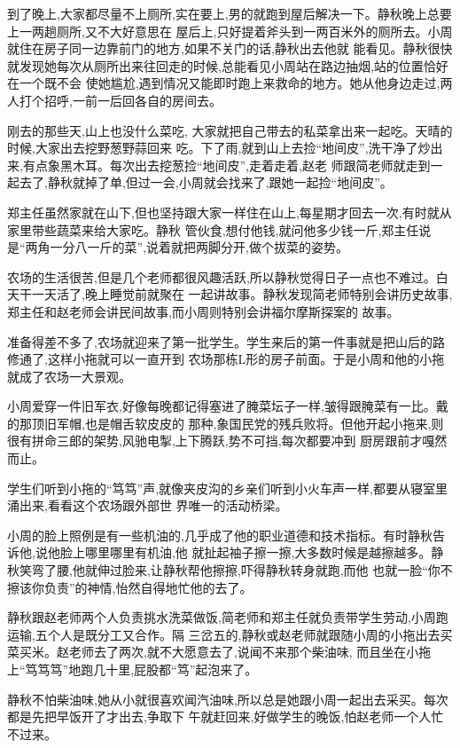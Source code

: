 ﻿\documentclass[12pt]{article}
\begin{document}
到了晚上,大家都尽量不上厕所,实在要上,男的就跑到屋后解决一下。静秋晚上总要上一两趟厕所,又不大好意思在
屋后上,只好提着斧头到一两百米外的厕所去。小周就住在房子同一边靠前门的地方,如果不关门的话,静秋出去他就
能看见。静秋很快就发现她每次从厕所出来往回走的时候,总能看见小周站在路边抽烟,站的位置恰好在一个既不会
使她尴尬,遇到情况又能即时跑上来救命的地方。她从他身边走过,两人打个招呼,一前一后回各自的房间去。



刚去的那些天,山上也没什么菜吃, 大家就把自己带去的私菜拿出来一起吃。天晴的时候,大家出去挖野葱野蒜回来
吃。下了雨,就到山上去捡``地间皮'',洗干净了炒出来,有点象黑木耳。每次出去挖葱捡``地间皮'',走着走着,赵老
师跟简老师就走到一起去了,静秋就掉了单,但过一会,小周就会找来了,跟她一起捡``地间皮''。

郑主任虽然家就在山下,但也坚持跟大家一样住在山上,每星期才回去一次,有时就从家里带些蔬菜来给大家吃。静秋
管伙食,想付他钱,就问他多少钱一斤,郑主任说是``两角一分八一斤的菜'',说着就把两脚分开,做个拔菜的姿势。

农场的生活很苦,但是几个老师都很风趣活跃,所以静秋觉得日子一点也不难过。白天干一天活了,晚上睡觉前就聚在
一起讲故事。静秋发现简老师特别会讲历史故事,郑主任和赵老师会讲民间故事,而小周则特别会讲福尔摩斯探案的
故事。

准备得差不多了,农场就迎来了第一批学生。学生来后的第一件事就是把山后的路修通了,这样小拖就可以一直开到
农场那栋L形的房子前面。于是小周和他的小拖就成了农场一大景观。

小周爱穿一件旧军衣,好像每晚都记得塞进了腌菜坛子一样,皱得跟腌菜有一比。戴的那顶旧军帽,也是帽舌软皮皮的
那种,象国民党的残兵败将。但他开起小拖来,则很有拼命三郎的架势,风驰电掣,上下腾跃,势不可挡,每次都要冲到
厨房跟前才嘎然而止。

学生们听到小拖的``笃笃''声,就像夹皮沟的乡亲们听到小火车声一样,都要从寝室里涌出来,看看这个农场跟外部世
界唯一的活动桥梁。

小周的脸上照例是有一些机油的,几乎成了他的职业道德和技术指标。有时静秋告诉他,说他脸上哪里哪里有机油,他
就扯起袖子擦一擦,大多数时候是越擦越多。静秋笑弯了腰,他就伸过脸来,让静秋帮他擦擦,吓得静秋转身就跑,而他
也就一脸``你不擦该你负责''的神情,怡然自得地忙他的去了。

静秋跟赵老师两个人负责挑水洗菜做饭,简老师和郑主任就负责带学生劳动,小周跑运输,五个人是既分工又合作。隔
三岔五的,静秋或赵老师就跟随小周的小拖出去买菜买米。赵老师去了两次,就不大愿意去了,说闻不来那个柴油味,
而且坐在小拖上``笃笃笃''地跑几十里,屁股都``笃''起泡来了。

静秋不怕柴油味,她从小就很喜欢闻汽油味,所以总是她跟小周一起出去采买。每次都是先把早饭开了才出去,争取下
午就赶回来,好做学生的晚饭,怕赵老师一个人忙不过来。
\end{document}
